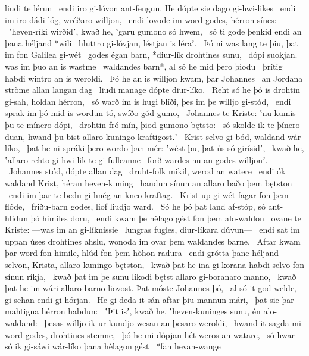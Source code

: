 liudi te lérun \hld\ endi iro gi-lóvon ant-fengun.
He dópte sie dago gi-hwi-likes \hld\ endi im iro dádi lóg,
wréðaro willjon, \hld\ endi lovode im word godes,
hérron sínes: \hld\ ʽheven-ríki wirðidʼ, kwað he,
ʽgaru gumono só hwem, \hld\ só ti gode þenkid
endi an þana héljand *wili \hld\ hluttro gi-lóvjan, %
léstjan is léraʼ. \hld\ Þó ni was lang te þiu,
þat im fon Galilea gi-wét \hld\ godes égan barn,
*diur-lík drohtines sunu, \hld\ dópi suokjan.
was im þuo an is wastme \hld\ waldandes barn*,
al só he mid þero þiodu \hld\ þrítig habdi
wintro an is weroldi. \hld\ Þó he an is willjon kwam,
þar Johannes \hld\ an Jordana stròme
allan langan dag \hld\ liudi manage
dópte diur-líko. \hld\ Reht só he þó is drohtin gi-sah,
holdan hérron, \hld\ só warð im is hugi blíði,
þes im þe willjo gi-stód, \hld\ endi sprak im þó mid is wordun tó,
swíðo gód gumo, \hld\ Johannes te Kriste:
ʽnu kumis þu te mínero dópi, \hld\ drohtin fró mín,
þiod-gumono bętsto: \hld\ só skolde ik te þínero duan,
hwand þu bist allaro kuningo kraftigost.ʼ \hld\ Krist selvo gi-bód,
waldand wár-líko, \hld\ þat he ni spráki þero wordo þan mér:
ʽwést þu, þat ús só girísidʼ, \hld\ kwað he, ʽallaro rehto gi-hwi-lik
te gi-fulleanne \hld\ forð-wardes nu
an godes willjonʼ. \hld\ Johannes stód,
dópte allan dag \hld\ druht-folk mikil,
werod an watere \hld\ endi ók waldand Krist,
héran heven-kuning \hld\ handun sínun
an allaro baðo þem bętston \hld\ endi im þar te bedu gi-hnég
an kneo kraftag. \hld\ Krist up gi-wét
fagar fon þem flóde, \hld\ friðu-barn godes,
liof liudjo ward. \hld\ Só he þó þat land af-stóp,
só ant-hlidun þó himiles doru, \hld\ endi kwam þe hèlago gést
fon þem alo-waldon \hld\ ovane te Kriste:
—was im an gi-líknissie \hld\ lungras fugles,
diur-líkara dúvun— \hld\ endi sat im uppan úses drohtines ahslu,
wonoda im ovar þem waldandes barne. \hld\ Aftar kwam þar word fon himile,
hlúd fon þem hòhon radura \hld\ endi grótta þane héljand selvon,
Krista, allaro kuningo bętston, \hld\ kwað þat he ina gi-korana habdi
selvo fon sínun ríkja, \hld\ kwað þat im þe sunu líkodi
bętst allaro gi-boranaro manno, \hld\ kwað þat he im wári allaro barno liovost.
Þat móste Johannes þó, \hld\ al só it god welde,
gi-sehan endi gi-hórjan. \hld\ He gi-deda it sán aftar þiu
mannun mári, \hld\ þat sie þar mahtigna
hérron habdun: \hld\ ʽÞit isʼ, kwað he, ʽheven-kuninges sunu,
én alo-waldand: \hld\ þesas willjo ik ur-kundjo
wesan an þesaro weroldi, \hld\ hwand it sagda mi word godes,
drohtines stemne, \hld\ þó he mi dópjan hét
weros an watare, \hld\ só hwar só ik gi-sáwi wár-líko
þana hèlagon gést \hld\ *fan hevan-wange
